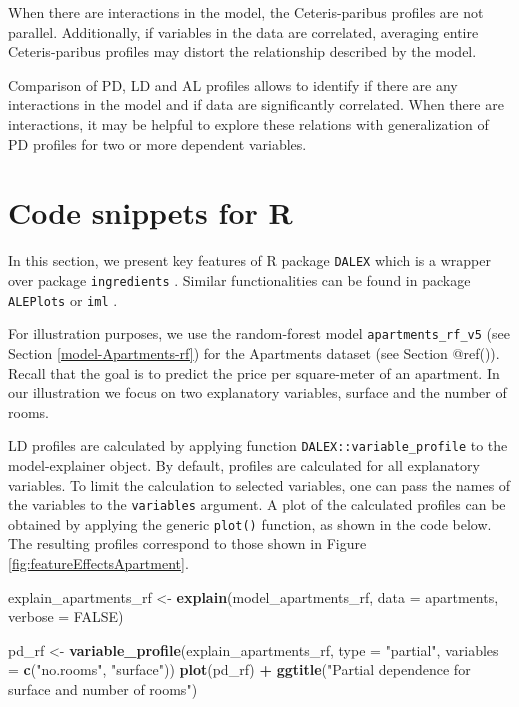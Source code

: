 \documentclass[]{krantz}
\newenvironment{Shaded}{\begin{snugshade}}{\end{snugshade}}
\newcommand{\DataTypeTok}[1]{\textcolor[rgb]{0.13,0.29,0.53}{#1}}
\newcommand{\KeywordTok}[1]{\textcolor[rgb]{0.13,0.29,0.53}{\textbf{#1}}}
\newcommand{\NormalTok}[1]{#1}
\newcommand{\OperatorTok}[1]{\textcolor[rgb]{0.81,0.36,0.00}{\textbf{#1}}}
\newcommand{\OtherTok}[1]{\textcolor[rgb]{0.56,0.35,0.01}{#1}}
\newcommand{\StringTok}[1]{\textcolor[rgb]{0.31,0.60,0.02}{#1}}
\begin{document}
When there are interactions in the model, the Ceteris-paribus profiles are not parallel. Additionally, if variables in the data are correlated, averaging entire Ceteris-paribus profiles may distort the relationship described by the model.

Comparison of PD, LD and AL profiles allows to identify if there are any interactions in the model and if data are significantly correlated. When there are interactions, it may be helpful to explore these relations with generalization of PD profiles for two or more dependent variables.

\hypertarget{ALPR}{%
\section{Code snippets for R}\label{ALPR}}

In this section, we present key features of R package \texttt{DALEX} which is a wrapper over package \texttt{ingredients} \citep{ingredientsRPackage}. Similar functionalities can be found in package \texttt{ALEPlots} \citep{ALEPlotRPackage} or \texttt{iml} \citep{imlRPackage}.

For illustration purposes, we use the random-forest model \texttt{apartments\_rf\_v5} (see Section \ref{model-Apartments-rf}) for the Apartments dataset (see Section @ref()). Recall that the goal is to predict the price per square-meter of an apartment. In our illustration we focus on two explanatory variables, surface and the number of rooms.

LD profiles are calculated by applying function \texttt{DALEX::variable\_profile} to the model-explainer object. By default, profiles are calculated for all explanatory variables. To limit the calculation to selected variables, one can pass the names of the variables to the \texttt{variables} argument. A plot of the calculated profiles can be obtained by applying the generic \texttt{plot()} function, as shown in the code below. The resulting profiles correspond to those shown in Figure \ref{fig:featureEffectsApartment}.

\begin{Shaded}
\begin{Highlighting}[]
\NormalTok{explain_apartments_rf <-}\StringTok{ }\KeywordTok{explain}\NormalTok{(model_apartments_rf, }
                                 \DataTypeTok{data =}\NormalTok{ apartments,}
                                 \DataTypeTok{verbose =} \OtherTok{FALSE}\NormalTok{)}

\NormalTok{pd_rf <-}\StringTok{ }\KeywordTok{variable_profile}\NormalTok{(explain_apartments_rf, }
                           \DataTypeTok{type =} \StringTok{"partial"}\NormalTok{,}
                          \DataTypeTok{variables =} \KeywordTok{c}\NormalTok{(}\StringTok{"no.rooms"}\NormalTok{, }\StringTok{"surface"}\NormalTok{))}
\KeywordTok{plot}\NormalTok{(pd_rf) }\OperatorTok{+}
\StringTok{  }\KeywordTok{ggtitle}\NormalTok{(}\StringTok{"Partial dependence for surface and number of rooms"}\NormalTok{) }
\end{Highlighting}
\end{Shaded}
\end{document}
